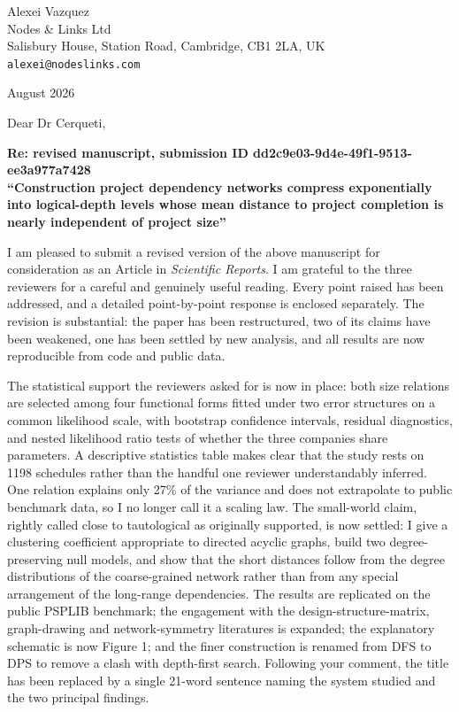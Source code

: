\documentclass[11pt,a4paper]{article}
\begin{document}
\noindent
Alexei Vazquez\\
Nodes \& Links Ltd\\
Salisbury House, Station Road, Cambridge, CB1 2LA, UK\\
\texttt{alexei@nodeslinks.com}

\vspace{0.8em}
 August 2026

\vspace{1em}
\noindent Dear Dr Cerqueti,

\vspace{0.3em}

{\noindent\small
\textbf{Re: revised manuscript, submission ID dd2c9e03-9d4e-49f1-9513-ee3a977a7428}\\
\textbf{``Construction project dependency networks compress exponentially into
logical-depth levels whose mean distance to project completion is nearly
independent of project size''}\par}

\vspace{0.3em}

I am pleased to submit a revised version of the above manuscript for
consideration as an Article in \emph{Scientific Reports}. I am grateful to the
three reviewers for a careful and genuinely useful reading. Every point raised
has been addressed, and a detailed point-by-point response is enclosed
separately. The revision is substantial: the paper has been restructured, two of
its claims have been weakened, one has been settled by new analysis, and all
results are now reproducible from code and public data.

The statistical support the reviewers asked for is now in place: both size
relations are selected among four functional forms fitted under two error
structures on a common likelihood scale, with bootstrap confidence intervals,
residual diagnostics, and nested likelihood ratio tests of whether the three
companies share parameters. A descriptive statistics table makes clear that the
study rests on 1198 schedules rather than the handful one reviewer understandably
inferred. One relation explains only 27\% of the variance and does not
extrapolate to public benchmark data, so I no longer call it a scaling law. The
small-world claim, rightly called close to tautological as originally supported,
is now settled: I give a clustering coefficient appropriate to directed acyclic
graphs, build two degree-preserving null models, and show that the short
distances follow from the degree distributions of the coarse-grained network
rather than from any special arrangement of the long-range dependencies. The
results are replicated on the public PSPLIB benchmark; the engagement with the
design-structure-matrix, graph-drawing and network-symmetry literatures is
expanded; the explanatory schematic is now Figure 1; and the finer construction
is renamed from DFS to DPS to remove a clash with depth-first search. Following
your comment, the title has been replaced by a single 21-word sentence naming
the system studied and the two principal findings.
\end{document}
